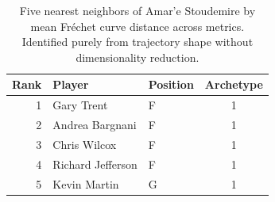 \begin{table}[htbp]
  \centering\small
  \begin{tabular}{rllc}
    \toprule
    Rank & Player & Position & Archetype \\
    \midrule
    1 & Gary Trent & F & 1 \\
    2 & Andrea Bargnani & F & 1 \\
    3 & Chris Wilcox & F & 1 \\
    4 & Richard Jefferson & F & 1 \\
    5 & Kevin Martin & G & 1 \\
    \bottomrule
  \end{tabular}
  \caption{Five nearest neighbors of Amar'e Stoudemire by mean Fr\'{e}chet curve distance across metrics. Identified purely from trajectory shape without dimensionality reduction.}
  \label{tab:Amar_e_Stoudemire_frechet_curve_neighbors}
\end{table}

